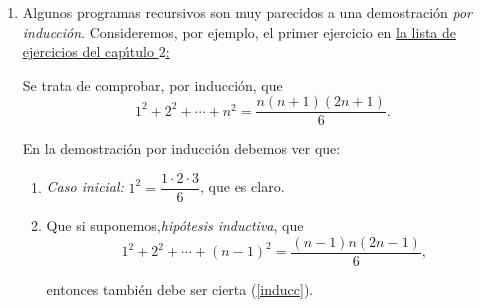 \begin{enumerate}
\begin{enumerate}
\item Para empezar podemos recomendar los n\'umeros \[2,4,8,10,12,21,24,23,26,27,28,29,30,35,36,37,39,41,45,46,50,57.\]

Son ejercicios del comienzo de la lista y, en general,  son m'as sencillos que los del final. Otros pocos, situados alrededor del n\'umero $400$ ser\'{\i}an

\item {\sc Ejercicio \#401:} Pide que se eval\'ue la suma de todos los cuadrados
de los divisores de un n\'umero $n$, y luego que se sumen esas sumas para $n$
entre $1$ y $N$. Puede ser dif\'{\i}cil evaluar esas sumas eficientemente para
$N$ muy grande. 
\item {\sc Ejercicio \#413:} Es un ejercicio en el manejo de cadenas de caracteres.
\item {\sc Ejercicio \#414:} En este se utilizan listas y el c\'alculo de \hyperref[orbitas]{\'orbitas}.
\item {\sc Ejercicio \#421:} Factorizaci\'on de enteros y de polinomios. {\sage} ser\'a de gran ayuda para resolverlo.
\item {\sc Ejercicio \#429:} Otro ejercicio sobre divisores de un entero.



\end{enumerate}

\item \label{induccion}Algunos programas recursivos son muy parecidos a una demostraci\'on
{\itshape por inducci\'on}. Consideremos,  por ejemplo, el primer ejercicio en 
\hyperref[rec]{la lista de ejercicios del cap\'{\i}tulo $2$:}

Se trata de comprobar, por inducci\'on, que 
\begin{equation}\label{inducc}
1^2+2^2+\cdots+n^2= \dfrac{n(n+1)(2n+1)}6.
\end{equation}

En la demostraci\'on por inducci\'on debemos ver que:

\begin{enumerate}
 \item {\itshape Caso inicial:} $1^2=\dfrac{1\cdot 2\cdot 3}6$, que es claro.
 \item Que si suponemos,{\itshape hip\'otesis inductiva},  que 
 \[ 1^2+2^2+\cdots+(n-1)^2= \dfrac{(n-1)n(2n-1)}6,\]
 
 \noindent entonces tambi\'en debe ser cierta (\ref{inducc}).
\end{enumerate}



\end{enumerate}
